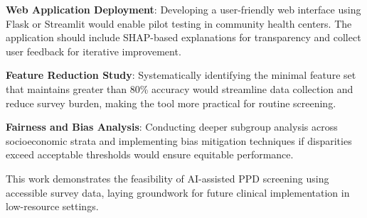 \textbf{Web Application Deployment}: Developing a user-friendly web interface using Flask or Streamlit would enable pilot testing in community health centers. The application should include SHAP-based explanations for transparency and collect user feedback for iterative improvement.

\textbf{Feature Reduction Study}: Systematically identifying the minimal feature set that maintains greater than 80\% accuracy would streamline data collection and reduce survey burden, making the tool more practical for routine screening.

\textbf{Fairness and Bias Analysis}: Conducting deeper subgroup analysis across socioeconomic strata and implementing bias mitigation techniques if disparities exceed acceptable thresholds would ensure equitable performance.

\vspace{10pt}
This work demonstrates the feasibility of AI-assisted PPD screening using accessible survey data, laying groundwork for future clinical implementation in low-resource settings.


